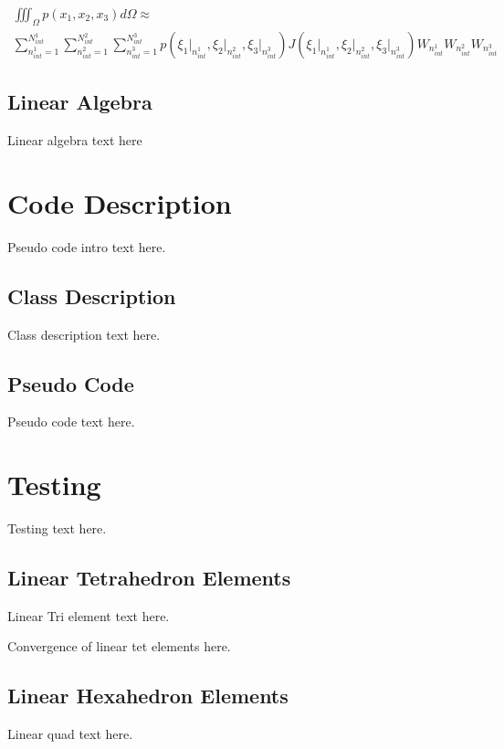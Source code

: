 \documentclass[a4paper, 12pt]{article}
\begin{document}
\begin{multline} \label{eq:J_numInt}
\iiint_{\Omega} p(x_1, x_2, x_3) d\Omega
  \approx \\
  \sum_{n^1_{int}=1}^{N^1_{int}} 
  \sum_{n^2_{int}=1}^{N^2_{int}} 
  \sum_{n^3_{int}=1}^{N^3_{int}} 
  p(
  \xi_1\Big|_{n^1_{int}}, 
  \xi_2\Big|_{n^2_{int}}, 
  \xi_3\Big|_{n^3_{int}})
  J(
  \xi_1\Big|_{n^1_{int}}, 
  \xi_2\Big|_{n^2_{int}}, 
  \xi_3\Big|_{n^3_{int}})
  W_{n^1_{int}}
  W_{n^2_{int}}
  W_{n^3_{int}}
\end{multline}



\subsection{Linear Algebra} \label{subsec:LinAlg}
Linear algebra text here

\section{Code Description} \label{sec:codeDes}
Pseudo code intro text here.

\subsection{Class Description} \label{subsec:class}
Class description text here.

\subsection{Pseudo Code} \label{subsec:pseudo}
Pseudo code text here.

\section{Testing} \label{sec:testing}
Testing text here.

\subsection{Linear Tetrahedron Elements} \label{subsec:linTet}
Linear Tri element text here.

Convergence of linear tet elements here.

\subsection{Linear Hexahedron Elements} \label{subsec:linHex}
Linear quad text here.
\end{document}
